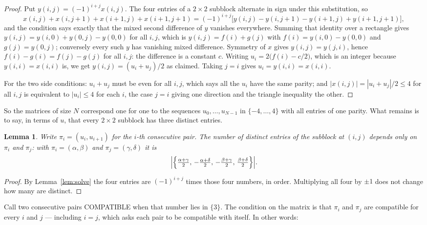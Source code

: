 \documentclass[11pt,a4paper]{article}
\theoremstyle{plain}
\newtheorem{lemma}[theorem]{Lemma}
\theoremstyle{definition}
\begin{document}
\begin{proof}
Put $y(i,j)=(-1)^{i+j}x(i,j)$. The four entries of a $2\times2$ subblock alternate in sign
under this substitution, so
\[
x(i,j)+x(i,j{+}1)+x(i{+}1,j)+x(i{+}1,j{+}1)
=(-1)^{i+j}\bigl[y(i,j)-y(i,j{+}1)-y(i{+}1,j)+y(i{+}1,j{+}1)\bigr],
\]
and the condition says exactly that the mixed second difference of $y$ vanishes everywhere.
Summing that identity over a rectangle gives
$y(i,j)=y(i,0)+y(0,j)-y(0,0)$ for all $i,j$, which is $y(i,j)=f(i)+g(j)$ with
$f(i)=y(i,0)-y(0,0)$ and $g(j)=y(0,j)$; conversely every such $y$ has vanishing mixed
difference. Symmetry of $x$ gives $y(i,j)=y(j,i)$, hence $f(i)-g(i)=f(j)-g(j)$ for all $i,j$:
the difference is a constant $c$. Writing $u_i=2\bigl(f(i)-c/2\bigr)$, which is an integer
because $y(i,i)=x(i,i)$ is, we get $y(i,j)=(u_i+u_j)/2$ as claimed. Taking $j=i$ gives
$u_i=y(i,i)=x(i,i)$.

For the two side conditions: $u_i+u_j$ must be even for all $i,j$, which says all the $u_i$ have
the same parity; and $|x(i,j)|=|u_i+u_j|/2\le4$ for all $i,j$ is equivalent to $|u_i|\le4$
for each $i$, the case $j=i$ giving one direction and the triangle inequality the other.
\end{proof}

So the matrices of size $N$ correspond one for one to the sequences $u_0,\dots,u_{N-1}$ in
$\{-4,\dots,4\}$ with all entries of one parity. What remains is to say, in terms of $u$,
that every $2\times2$ subblock has three distinct entries.

\begin{lemma}\label{lem:block}
Write $\pi_i=(u_i,u_{i+1})$ for the $i$-th consecutive pair. The number of distinct entries of
the subblock at $(i,j)$ depends only on $\pi_i$ and $\pi_j$: with $\pi_i=(\alpha,\beta)$ and
$\pi_j=(\gamma,\delta)$ it is
\[
\Bigl|\Bigl\{\tfrac{\alpha+\gamma}{2},\,-\tfrac{\alpha+\delta}{2},\,
-\tfrac{\beta+\gamma}{2},\,\tfrac{\beta+\delta}{2}\Bigr\}\Bigr| .
\]
\end{lemma}

\begin{proof}
By Lemma~\ref{lem:solve} the four entries are $(-1)^{i+j}$ times those four numbers, in
order. Multiplying all four by $\pm1$ does not change how many are distinct.
\end{proof}

Call two consecutive pairs COMPATIBLE when that number lies in $\{3\}$. The condition on the
matrix is that $\pi_i$ and $\pi_j$ are compatible for every $i$ and $j$ --- including $i=j$,
which asks each pair to be compatible with itself. In other words:
\end{document}
